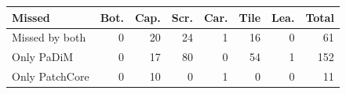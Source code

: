 \begin{tabular}{@{}l@{\,}r@{\,}r@{\,}r@{\,}r@{\,}r@{\,}r@{\,}r@{}}
\toprule
Missed & Bot. & Cap. & Scr. & Car. & Tile & Lea. & Total \\
\midrule
Missed by both & 0 & 20 & 24 & 1 & 16 & 0 & 61 \\
Only PaDiM & 0 & 17 & 80 & 0 & 54 & 1 & 152 \\
Only PatchCore & 0 & 10 & 0 & 1 & 0 & 0 & 11 \\
\bottomrule
\end{tabular}
